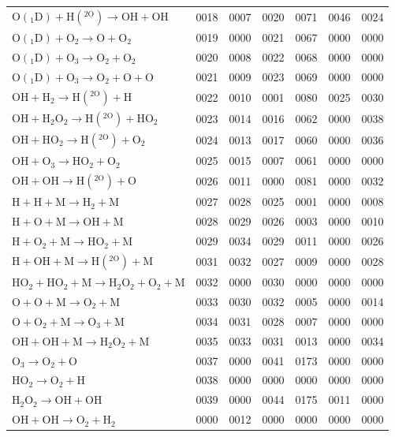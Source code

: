 \begin{longtable}{lrrrrrr}
$\mathrm{O(_1D) + H(^{2O}) \rightarrow OH + OH}$ & 0018 & 0007 & 0020 & 0071 & 0046 & 0024 \\
$\mathrm{O(_1D) + O_2 \rightarrow O + O_2}$ & 0019 & 0000 & 0021 & 0067 & 0000 & 0000 \\
$\mathrm{O(_1D) + O_3 \rightarrow O_2 + O_2}$ & 0020 & 0008 & 0022 & 0068 & 0000 & 0000 \\
$\mathrm{O(_1D) + O_3 \rightarrow O_2 + O + O}$ & 0021 & 0009 & 0023 & 0069 & 0000 & 0000 \\
$\mathrm{OH + H_2 \rightarrow H(^{2O}) + H}$ & 0022 & 0010 & 0001 & 0080 & 0025 & 0030 \\
$\mathrm{OH + H_2O_2 \rightarrow H(^{2O}) + HO_2}$ & 0023 & 0014 & 0016 & 0062 & 0000 & 0038 \\
$\mathrm{OH + HO_2 \rightarrow H(^{2O}) + O_2}$ & 0024 & 0013 & 0017 & 0060 & 0000 & 0036 \\
$\mathrm{OH + O_3 \rightarrow HO_2 + O_2}$ & 0025 & 0015 & 0007 & 0061 & 0000 & 0000 \\
$\mathrm{OH + OH \rightarrow H(^{2O}) + O}$ & 0026 & 0011 & 0000 & 0081 & 0000 & 0032 \\
$\mathrm{H + H + M \rightarrow H_2 + M}$ & 0027 & 0028 & 0025 & 0001 & 0000 & 0008 \\
$\mathrm{H + O + M \rightarrow OH + M}$ & 0028 & 0029 & 0026 & 0003 & 0000 & 0010 \\
$\mathrm{H + O_2 + M \rightarrow HO_2 + M}$ & 0029 & 0034 & 0029 & 0011 & 0000 & 0026 \\
$\mathrm{H + OH + M \rightarrow H(^{2O}) + M}$ & 0031 & 0032 & 0027 & 0009 & 0000 & 0028 \\
$\mathrm{HO_2 + HO_2 + M \rightarrow H_2O_2 + O_2 + M}$ & 0032 & 0000 & 0030 & 0000 & 0000 & 0000 \\
$\mathrm{O + O + M \rightarrow O_2 + M}$ & 0033 & 0030 & 0032 & 0005 & 0000 & 0014 \\
$\mathrm{O + O_2 + M \rightarrow O_3 + M}$ & 0034 & 0031 & 0028 & 0007 & 0000 & 0000 \\
$\mathrm{OH + OH + M \rightarrow H_2O_2 + M}$ & 0035 & 0033 & 0031 & 0013 & 0000 & 0034 \\
$\mathrm{O_3 \rightarrow O_2 + O}$ & 0037 & 0000 & 0041 & 0173 & 0000 & 0000 \\
$\mathrm{HO_2 \rightarrow O_2 + H}$ & 0038 & 0000 & 0000 & 0000 & 0000 & 0000 \\
$\mathrm{H_2O_2 \rightarrow OH + OH}$ & 0039 & 0000 & 0044 & 0175 & 0011 & 0000 \\
$\mathrm{OH + OH \rightarrow O_2 + H_2}$ & 0000 & 0012 & 0000 & 0000 & 0000 & 0000 \\

\end{longtable}
